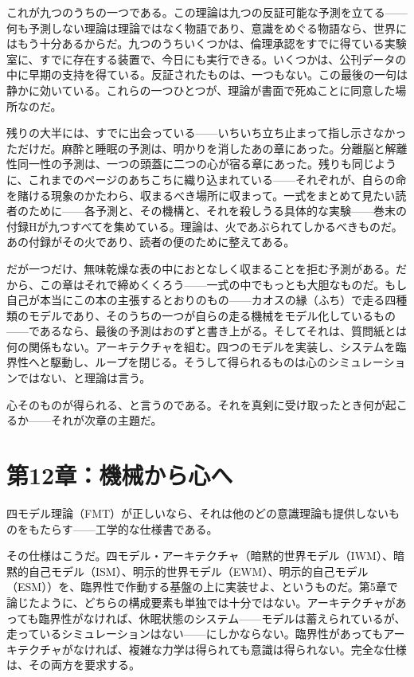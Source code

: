 \documentclass[11pt, twoside, openright]{book}
\begin{document}
これが九つのうちの一つである。この理論は九つの反証可能な予測を立てる------何も予測しない理論は理論ではなく物語であり、意識をめぐる物語なら、世界にはもう十分あるからだ。九つのうちいくつかは、倫理承認をすでに得ている実験室に、すでに存在する装置で、今日にも実行できる。いくつかは、公刊データの中に早期の支持を得ている。反証されたものは、一つもない。この最後の一句は静かに効いている。これらの一つひとつが、理論が書面で死ぬことに同意した場所なのだ。

残りの大半には、すでに出会っている------いちいち立ち止まって指し示さなかっただけだ。麻酔と睡眠の予測は、明かりを消したあの章にあった。分離脳と解離性同一性の予測は、一つの頭蓋に二つの心が宿る章にあった。残りも同じように、これまでのページのあちこちに織り込まれている------それぞれが、自らの命を賭ける現象のかたわら、収まるべき場所に収まって。一式をまとめて見たい読者のために------各予測と、その機構と、それを殺しうる具体的な実験------巻末の付録Hが九つすべてを集めている。理論は、火であぶられてしかるべきものだ。あの付録がその火であり、読者の便のために整えてある。

だが一つだけ、無味乾燥な表の中におとなしく収まることを拒む予測がある。だから、この章はそれで締めくくろう------一式の中でもっとも大胆なものだ。もし自己が本当にこの本の主張するとおりのもの------カオスの縁（ふち）で走る四種類のモデルであり、そのうちの一つが自らの走る機械をモデル化しているもの------であるなら、最後の予測はおのずと書き上がる。そしてそれは、質問紙とは何の関係もない。アーキテクチャを組む。四つのモデルを実装し、システムを臨界性へと駆動し、ループを閉じる。そうして得られるものは心のシミュレーションではない、と理論は言う。

心そのものが得られる、と言うのである。それを真剣に受け取ったとき何が起こるか------それが次章の主題だ。


\chapter*{第12章：機械から心へ}

四モデル理論（FMT）が正しいなら、それは他のどの意識理論も提供しないものをもたらす------工学的な仕様書である。

その仕様はこうだ。四モデル・アーキテクチャ（暗黙的世界モデル（IWM）、暗黙的自己モデル（ISM）、明示的世界モデル（EWM）、明示的自己モデル（ESM））を、臨界性で作動する基盤の上に実装せよ、というものだ。第5章で論じたように、どちらの構成要素も単独では十分ではない。アーキテクチャがあっても臨界性がなければ、休眠状態のシステム------モデルは蓄えられているが、走っているシミュレーションはない------にしかならない。臨界性があってもアーキテクチャがなければ、複雑な力学は得られても意識は得られない。完全な仕様は、その両方を要求する。
\end{document}
